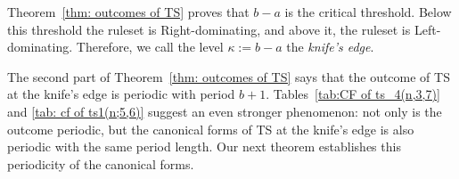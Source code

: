 \documentclass[oneside,reqno]{amsart}
\begin{document}
Theorem~\ref{thm: outcomes of TS} proves that $b-a$ is the critical threshold. Below this threshold the ruleset is Right-dominating, and above it, the ruleset is Left-dominating. Therefore, we call the level $\kappa:=b-a$ the {\em knife's edge}. 

The second part of Theorem~\ref{thm: outcomes of TS} says that the outcome of {\sc TS} at the knife's edge is periodic with period $b+1$. Tables~\ref{tab:CF of ts_4(n,3,7)} and \ref{tab: cf of ts1(n;5,6)} suggest an even stronger phenomenon: not only is the outcome periodic, but the canonical forms of {\sc TS} at the knife's edge is also periodic with the same period length. Our next theorem establishes this periodicity of the canonical forms.%

\end{document}
